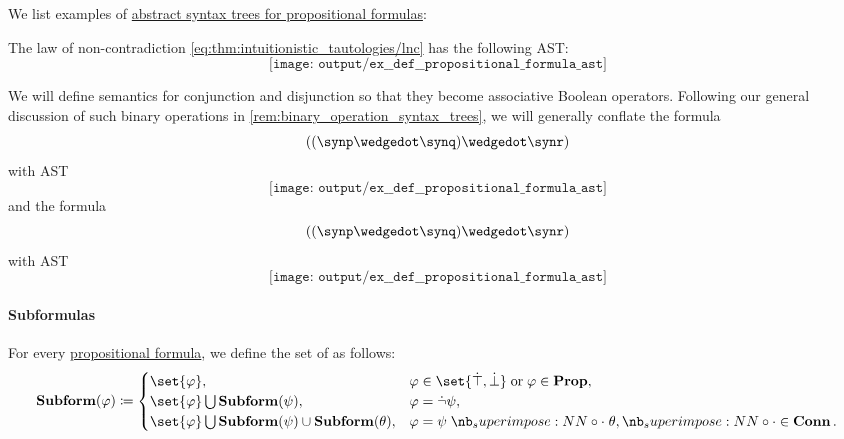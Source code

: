 \begin{example}\label{ex:def:propositional_formula_ast}
  We list examples of \hyperref[def:propositional_formula_ast]{abstract syntax trees for propositional formulas}:
  \begin{thmenum}
     The law of non-contradiction \eqref{eq:thm:intuitionistic_tautologies/lnc} has the following AST:
    \begin{equation*}
      \texttt{[image: output/ex\_\_def\_\_propositional\_formula\_ast]}
    \end{equation*}

     We will define semantics for conjunction and disjunction so that they become associative Boolean operators. Following our general discussion of such binary operations in \cref{rem:binary_operation_syntax_trees}, we will generally conflate the formula
    \begin{equation*}
      ((\synp \synwedge \synq) \synwedge \synr)
    \end{equation*}
    with AST
    \begin{equation*}
      \texttt{[image: output/ex\_\_def\_\_propositional\_formula\_ast]}
    \end{equation*}
    and the formula
    \begin{equation*}
      ((\synp \synwedge \synq) \synwedge \synr)
    \end{equation*}
    with AST
    \begin{equation*}
      \texttt{[image: output/ex\_\_def\_\_propositional\_formula\_ast]}
    \end{equation*}
  \end{thmenum}
\end{example}

\paragraph{Subformulas}

\begin{definition}\label{def:propositional_subformula}
  For every \hyperref[def:propositional_syntax/formula]{propositional formula}, we define the set of  as follows:
  \begin{equation*}
    \op*{Subform}(\varphi) \coloneqq \begin{cases}
      \set{ \varphi },                                                        &\varphi \in \set{ \syntop, \synbot } \T{or} \varphi \in \op*{Prop}, \\
      \set{ \varphi } \bigcup \op*{Subform}(\psi),                            &\varphi = \synneg \psi, \\
      \set{ \varphi } \bigcup \op*{Subform}(\psi) \cup \op*{Subform}(\theta), &\varphi = \psi \syncirc \theta, {\syncirc} \in \op*{Conn}.
    \end{cases}
  \end{equation*}
\end{definition}

